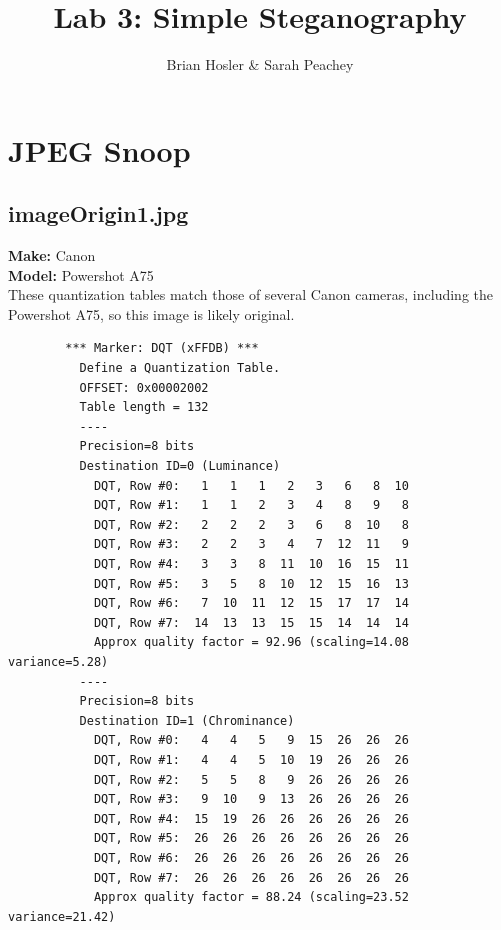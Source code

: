 \documentclass{article}
\begin{document}
\title{Lab 3: Simple Steganography}
\author{Brian Hosler \& Sarah Peachey }
\maketitle


\section{JPEG Snoop}

\subsection{imageOrigin1.jpg}
	\textbf{Make:} Canon\\
	\textbf{Model:} Powershot A75\\
These quantization tables match those of several Canon cameras,
including the Powershot A75, so this image is likely original.
\begin{lstlisting}
		*** Marker: DQT (xFFDB) ***
		  Define a Quantization Table.
		  OFFSET: 0x00002002
		  Table length = 132
		  ----
		  Precision=8 bits
		  Destination ID=0 (Luminance)
			DQT, Row #0:   1   1   1   2   3   6   8  10 
			DQT, Row #1:   1   1   2   3   4   8   9   8 
			DQT, Row #2:   2   2   2   3   6   8  10   8 
			DQT, Row #3:   2   2   3   4   7  12  11   9 
			DQT, Row #4:   3   3   8  11  10  16  15  11 
			DQT, Row #5:   3   5   8  10  12  15  16  13 
			DQT, Row #6:   7  10  11  12  15  17  17  14 
			DQT, Row #7:  14  13  13  15  15  14  14  14 
			Approx quality factor = 92.96 (scaling=14.08 variance=5.28)
		  ----
		  Precision=8 bits
		  Destination ID=1 (Chrominance)
			DQT, Row #0:   4   4   5   9  15  26  26  26 
			DQT, Row #1:   4   4   5  10  19  26  26  26 
			DQT, Row #2:   5   5   8   9  26  26  26  26 
			DQT, Row #3:   9  10   9  13  26  26  26  26 
			DQT, Row #4:  15  19  26  26  26  26  26  26 
			DQT, Row #5:  26  26  26  26  26  26  26  26 
			DQT, Row #6:  26  26  26  26  26  26  26  26 
			DQT, Row #7:  26  26  26  26  26  26  26  26 
			Approx quality factor = 88.24 (scaling=23.52 variance=21.42)
\end{lstlisting}
\end{document}
